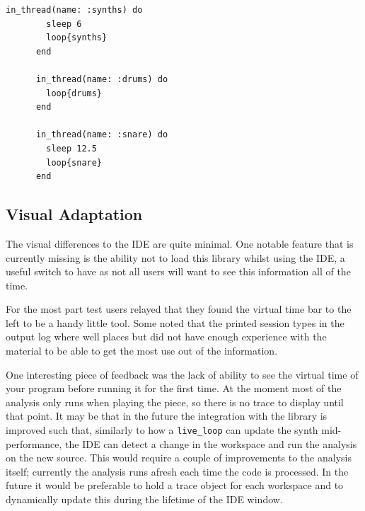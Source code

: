\documentclass[11pt, abstracton, twoside, titlepage=true]{scrartcl}
\begin{document}
\begin{minipage}{\textwidth}
	\begin{lstlisting}[style = sonicpi]
      in_thread(name: :synths) do
        sleep 6
        loop{synths}
      end
      
      in_thread(name: :drums) do
        loop{drums}
      end
      
      in_thread(name: :snare) do
        sleep 12.5
        loop{snare}
      end
	\end{lstlisting}
\end{minipage}

\subsection{Visual Adaptation}

The visual differences to the IDE are quite minimal. One notable feature that is 
currently missing is the ability not to load this library whilst using the IDE, a 
useful switch to have as not all users will want to see this information all of the
time. 

For the most part test users relayed that they found the virtual time bar to the 
left to be a handy little tool. Some noted that the printed session types in the 
output log where well places but did not have enough experience with the material 
to be able to get the most use out of the information. 

One interesting piece of 
feedback was the lack of ability to see the virtual time of your program before 
running it for the first time. At the moment most of the analysis only runs 
when playing the piece, so there is no trace to display until that point. It may 
be that in the future the integration with the library is improved such that, 
similarly to how a \texttt{live\_loop} can update the synth mid-performance,
the IDE can detect a change in the workspace and run the analysis on the new source. 
This would require a couple of improvements to the analysis itself; currently the 
analysis runs afresh each time the code is processed. In the future it would be
preferable to hold a trace object for each workspace and to dynamically update 
this during the lifetime of the IDE window. 


\end{document}
